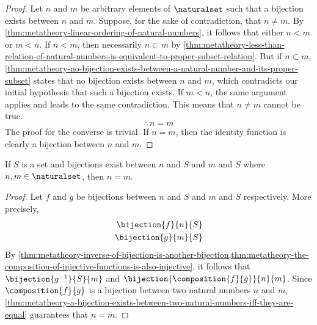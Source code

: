 \begin{proof}
    Let \( n \) and \( m \) be arbitrary elements of \( \naturalset \) such that a bijection exists between \( n \) and \( m \).
    Suppose, for the sake of contradiction, that \( n \neq m \).
    By \cref{thm:metatheory-linear-ordering-of-natural-numbers}, it follows that either \( n < m  \) or \( m < n \).
    If \( n < m \), then necessarily \( n \subset m \) by \cref{thm:metatheory-less-than-relation-of-natural-numbers-is-equivalent-to-proper-subset-relation}.
    But if \( n \subset m \), \cref{thm:metatheory-no-bijection-exists-between-a-natural-number-and-its-proper-subset} states that no bijection exists between
    \( n \) and \( m \), which contradicts our initial hypothesis that such a bijection exists.
    If \( m < n \), the same argument applies and leads to the same contradiction.
    This means that \( n \neq m \) cannot be true.
    \begin{equation*}
        \therefore \, n = m
    \end{equation*}
    The proof for the converse is trivial. If \( n = m \), then the identity function is clearly a bijection between \( n \) and \( m \).
\end{proof}

\begin{thm}
     \label{thm:metatheory-a-set-can-form-a-bijection-with-at-most-one-natural-number}
    If \( S \) is a set and bijections exist between \( n \) and \( S \) and \( m \) and \( S \) where \( n, m \in \naturalset \),
    then \( n = m \).
\end{thm}

\begin{proof}
    Let \( f \) and \( g \) be bijections between \( n \) and \( S \) and \( m \) and \( S \) respectively.
    More precisely,
    \begin{align*}
        \bijection{f}{n}{S} \\
        \bijection{g}{m}{S}
    \end{align*}
    By \cref{thm:metatheory-inverse-of-bijection-is-another-bijection,thm:metatheory-the-composition-of-injective-functions-is-also-injective},
    it follows that \( \bijection{g^{-1}}{S}{m} \) and \( \bijection{\composition{f}{g}}{n}{m} \).
    Since \( \composition{f}{g} \) is a bijection between two natural numbers \( n \) and \( m \),
    \cref{thm:metatheory-a-bijection-exists-between-two-natural-numbers-iff-they-are-equal} guarantees that \( n = m \).
\end{proof}

